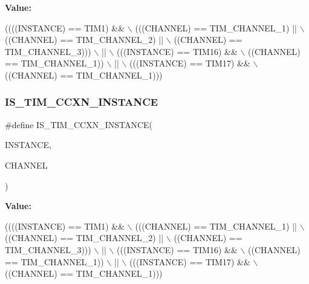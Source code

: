 {\bfseries Value\+:}
\begin{DoxyCode}
((((INSTANCE) == TIM1) &&                    \(\backslash\)
     (((CHANNEL) == TIM\_CHANNEL\_1) ||           \(\backslash\)
      ((CHANNEL) == TIM\_CHANNEL\_2) ||           \(\backslash\)
      ((CHANNEL) == TIM\_CHANNEL\_3)))            \(\backslash\)
    ||                                          \(\backslash\)
    (((INSTANCE) == TIM16) &&                   \(\backslash\)
     ((CHANNEL) == TIM\_CHANNEL\_1))              \(\backslash\)
    ||                                          \(\backslash\)
    (((INSTANCE) == TIM17) &&                   \(\backslash\)
     ((CHANNEL) == TIM\_CHANNEL\_1)))
\end{DoxyCode}
\mbox{\label{group___exported__macro_ga7181cfd1649c4e65e24b7c863e94a54f}} 
\subsubsection{\texorpdfstring{I\+S\+\_\+\+T\+I\+M\+\_\+\+C\+C\+X\+N\+\_\+\+I\+N\+S\+T\+A\+N\+CE}{IS\_TIM\_CCXN\_INSTANCE}\hspace{0.1cm}{\footnotesize\ttfamily [4/16]}}
{\footnotesize\ttfamily \#define I\+S\+\_\+\+T\+I\+M\+\_\+\+C\+C\+X\+N\+\_\+\+I\+N\+S\+T\+A\+N\+CE(\begin{DoxyParamCaption}\item[{}]{I\+N\+S\+T\+A\+N\+CE,  }\item[{}]{C\+H\+A\+N\+N\+EL }\end{DoxyParamCaption})}

{\bfseries Value\+:}
\begin{DoxyCode}
((((INSTANCE) == TIM1) &&                    \(\backslash\)
     (((CHANNEL) == TIM\_CHANNEL\_1) ||           \(\backslash\)
      ((CHANNEL) == TIM\_CHANNEL\_2) ||           \(\backslash\)
      ((CHANNEL) == TIM\_CHANNEL\_3)))            \(\backslash\)
    ||                                          \(\backslash\)
    (((INSTANCE) == TIM16) &&                   \(\backslash\)
     ((CHANNEL) == TIM\_CHANNEL\_1))              \(\backslash\)
    ||                                          \(\backslash\)
    (((INSTANCE) == TIM17) &&                   \(\backslash\)
     ((CHANNEL) == TIM\_CHANNEL\_1)))
\end{DoxyCode}
\mbox{\label{group___exported__macro_ga7181cfd1649c4e65e24b7c863e94a54f}} 

